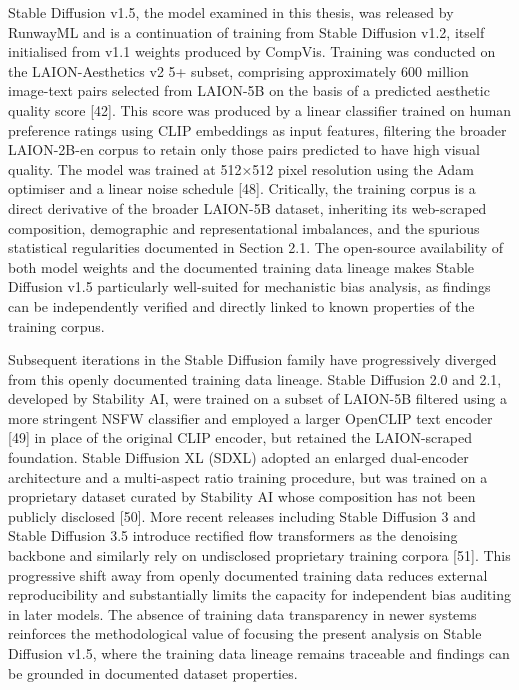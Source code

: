 Stable Diffusion v1.5, the model examined in this thesis, was released by RunwayML and is a continuation of training from Stable Diffusion v1.2, itself initialised from v1.1 weights produced by CompVis. Training was conducted on the LAION-Aesthetics v2 5+ subset, comprising approximately 600 million image-text pairs selected from LAION-5B on the basis of a predicted aesthetic quality score [42]. This score was produced by a linear classifier trained on human preference ratings using CLIP embeddings as input features, filtering the broader LAION-2B-en corpus to retain only those pairs predicted to have high visual quality. The model was trained at 512×512 pixel resolution using the Adam optimiser and a linear noise schedule [48]. Critically, the training corpus is a direct derivative of the broader LAION-5B dataset, inheriting its web-scraped composition, demographic and representational imbalances, and the spurious statistical regularities documented in Section 2.1. The open-source availability of both model weights and the documented training data lineage makes Stable Diffusion v1.5 particularly well-suited for mechanistic bias analysis, as findings can be independently verified and directly linked to known properties of the training corpus.

Subsequent iterations in the Stable Diffusion family have progressively diverged from this openly documented training data lineage. Stable Diffusion 2.0 and 2.1, developed by Stability AI, were trained on a subset of LAION-5B filtered using a more stringent NSFW classifier and employed a larger OpenCLIP text encoder [49] in place of the original CLIP encoder, but retained the LAION-scraped foundation. Stable Diffusion XL (SDXL) adopted an enlarged dual-encoder architecture and a multi-aspect ratio training procedure, but was trained on a proprietary dataset curated by Stability AI whose composition has not been publicly disclosed [50]. More recent releases including Stable Diffusion 3 and Stable Diffusion 3.5 introduce rectified flow transformers as the denoising backbone and similarly rely on undisclosed proprietary training corpora [51]. This progressive shift away from openly documented training data reduces external reproducibility and substantially limits the capacity for independent bias auditing in later models. The absence of training data transparency in newer systems reinforces the methodological value of focusing the present analysis on Stable Diffusion v1.5, where the training data lineage remains traceable and findings can be grounded in documented dataset properties.

